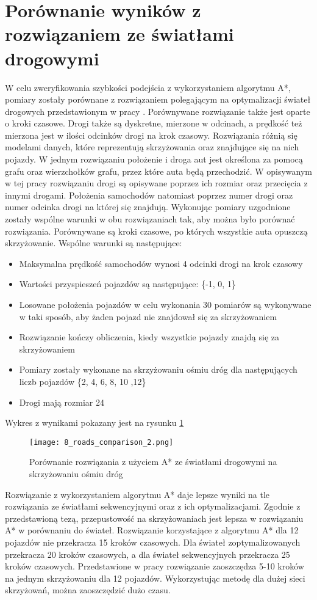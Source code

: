 \section{Porównanie wyników z rozwiązaniem ze światłami drogowymi}

W celu zweryfikowania szybkości podejścia z wykorzystaniem algorytmu A*, pomiary zostały porównane z rozwiązaniem polegającym na optymalizacji świateł drogowych przedstawionym w pracy \cite{slakomy}. Porównywane rozwiązanie także jest oparte o kroki czasowe. Drogi także są dyskretne, mierzone w odcinach, a prędkość też mierzona jest w ilości odcinków drogi na krok czasowy.
\newline
\indent
Rozwiązania różnią się modelami danych, które reprezentują skrzyżowania oraz znajdujące się na nich pojazdy. W jednym rozwiązaniu położenie i droga aut jest określona za pomocą grafu oraz wierzchołków grafu, przez które auta będą przechodzić. W opisywanym w tej pracy rozwiązaniu drogi są opisywane poprzez ich rozmiar oraz przecięcia z innymi drogami. Położenia samochodów natomiast poprzez numer drogi oraz numer odcinka drogi na której się znajdują.
\newline
\indent
Wykonując pomiary uzgodnione zostały wspólne warunki w obu rozwiązaniach tak, aby można było porównać rozwiązania. Porównywane są kroki czasowe, po których wszystkie auta opuszczą skrzyżowanie. Wspólne warunki są następujące:
\begin{itemize}
\item Maksymalna prędkość samochodów wynosi 4 odcinki drogi na krok czasowy
\item Wartości przyspieszeń pojazdów są następujące: \{-1, 0, 1\}
\item Losowane położenia pojazdów w celu wykonania 30 pomiarów są wykonywane w taki sposób, aby żaden pojazd nie znajdował się za skrzyżowaniem
\item Rozwiązanie kończy obliczenia, kiedy wszystkie pojazdy znajdą się za skrzyżowaniem
\item Pomiary zostały wykonane na skrzyżowaniu ośmiu dróg dla następujących liczb pojazdów \{2, 4, 6, 8, 10 ,12\}
\item Drogi mają rozmiar 24
\end{itemize}
Wykres z wynikami pokazany jest na rysunku \ref{comparison}
\begin{figure}[H]
  \texttt{[image: 8\_roads\_comparison\_2.png]}
  \caption{Porównanie rozwiązania z użyciem A* ze światłami drogowymi na skrzyżowaniu ośmiu dróg}
  \label{comparison}
\end{figure}
Rozwiązanie z wykorzystaniem algorytmu A* daje lepsze wyniki na tle rozwiązania ze światłami sekwencyjnymi oraz z ich optymalizacjami. Zgodnie z przedstawioną tezą, przepustowość na skrzyżowaniach jest lepsza w rozwiązaniu A* w porównaniu do świateł. Rozwiązanie korzystające z algorytmu A* dla 12 pojazdów nie przekracza 15 kroków czasowych. Dla świateł zoptymalizowanych przekracza 20 kroków czasowych, a dla świateł sekwencyjnych przekracza 25 kroków czasowych. Przedstawione w pracy rozwiązanie zaoszczędza 5-10 kroków na jednym skrzyżowaniu dla 12 pojazdów. Wykorzystując metodę dla dużej sieci skrzyżowań, można zaoszczędzić dużo czasu.
